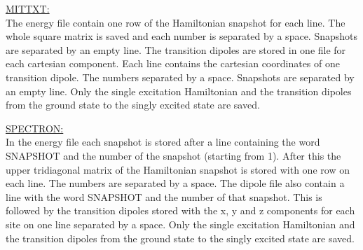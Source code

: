 \noindent
\underline{MITTXT:}\\
The energy file contain one row of the Hamiltonian snapshot for each line. The whole square matrix is saved and each number is separated by a space. Snapshots are separated by an empty line. The transition dipoles are stored in one file for each cartesian component. Each line contains the cartesian coordinates of one transition dipole. The numbers separated by a space. Snapshots are separated by an empty line. Only the single excitation Hamiltonian and the transition dipoles from the ground state to the singly excited state are saved.

\noindent
\underline{SPECTRON:}\\
In the energy file each snapshot is stored after a line containing the word SNAPSHOT and the number
of the snapshot (starting from 1). After this the upper tridiagonal matrix of the Hamiltonian snapshot is stored with one row on each line. The numbers are separated by a space. The dipole file also contain a line with the word SNAPSHOT and the number of that snapshot. This is followed by the transition dipoles stored with the x, y and z components for each site on one line separated by a space. Only the single excitation Hamiltonian and the transition dipoles from the ground state to the singly excited state are saved.


